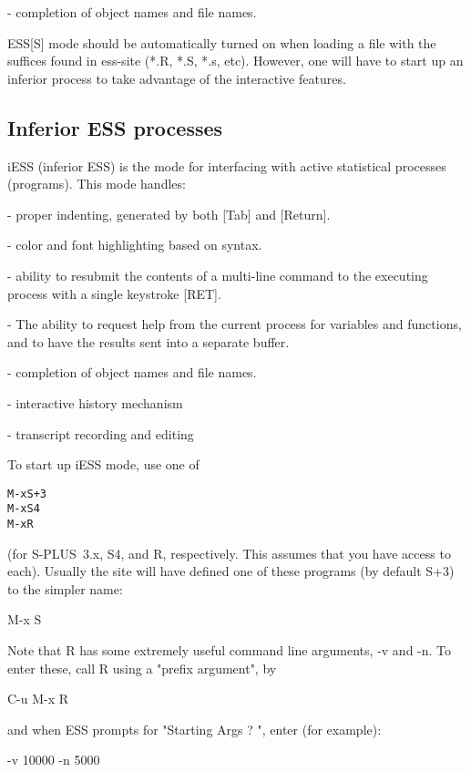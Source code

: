 \documentclass{article}
\newcommand*{\Splus}{\textsc{S-PLUS}}
\newenvironment{Salltt}{\small\begin{alltt}}{\end{alltt}}
\begin{document}
- completion of object names and file names.

ESS[S] mode should be automatically turned on when loading a file with
the suffices found in ess-site (*.R, *.S, *.s, etc).  However, one
will have to start up an inferior process to take advantage of the
interactive features.


\subsection{Inferior ESS processes}
\label{sec:S:inf}

iESS (inferior ESS) is the mode for interfacing with active
statistical processes (programs).  This mode handles:

- proper indenting, generated by both [Tab] and [Return].

- color and font highlighting based on syntax.

- ability to resubmit the contents of a multi-line command
  to the executing process with a single keystroke [RET].

- The ability to request help from the current process for variables
  and functions, and to have the results sent into a separate buffer.

- completion of object names and file names.

- interactive history mechanism

- transcript recording and editing

To start up iESS mode, use one of
\begin{Salltt}
   M-x S+3 
   M-x S4
   M-x R
\end{Salltt}
(for \Splus~3.x, S4, and R, respectively.  This assumes that you have
access to each).  Usually the site will have defined one of these programs
(by default S+3) to the simpler name:

   M-x S



Note that R has some extremely useful command line arguments, 
-v and -n.   To enter these, call R using a "prefix argument", by

   C-u M-x R

and when ESS prompts for "Starting Args ? ", enter (for example):

   -v 10000 -n 5000
\end{document}
